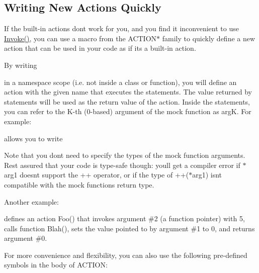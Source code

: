\subsection*{Writing New Actions Quickly}

If the built-\/in actions don\textquotesingle{}t work for you, and you find it inconvenient to use {\ttfamily \mbox{\hyperlink{namespacetesting_a12aebaf8363d49a383047529f798b694}{Invoke()}}}, you can use a macro from the {\ttfamily A\+C\+T\+I\+O\+N$\ast$} family to quickly define a new action that can be used in your code as if it\textquotesingle{}s a built-\/in action.

By writing 
\begin{DoxyCode}{0}
\end{DoxyCode}
 in a namespace scope (i.\+e. not inside a class or function), you will define an action with the given name that executes the statements. The value returned by {\ttfamily statements} will be used as the return value of the action. Inside the statements, you can refer to the K-\/th (0-\/based) argument of the mock function as {\ttfamily argK}. For example\+: 
\begin{DoxyCode}{0}
\end{DoxyCode}
 allows you to write 
\begin{DoxyCode}{0}
\end{DoxyCode}


Note that you don\textquotesingle{}t need to specify the types of the mock function arguments. Rest assured that your code is type-\/safe though\+: you\textquotesingle{}ll get a compiler error if {\ttfamily $\ast$arg1} doesn\textquotesingle{}t support the {\ttfamily ++} operator, or if the type of {\ttfamily ++($\ast$arg1)} isn\textquotesingle{}t compatible with the mock function\textquotesingle{}s return type.

Another example\+: 
\begin{DoxyCode}{0}
\DoxyCodeLine{\}}
\end{DoxyCode}
 defines an action {\ttfamily Foo()} that invokes argument \#2 (a function pointer) with 5, calls function {\ttfamily Blah()}, sets the value pointed to by argument \#1 to 0, and returns argument \#0.

For more convenience and flexibility, you can also use the following pre-\/defined symbols in the body of {\ttfamily A\+C\+T\+I\+ON}\+:

